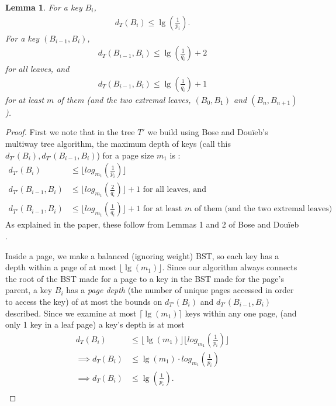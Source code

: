 \documentclass[letterpaper,12pt,titlepage,oneside,final]{book}
\theoremstyle{plain}
\newtheorem{lem}[thm]{Lemma}
\begin{document}
\begin{lem} \label{451}
For a key $B_i$,
\begin{align*} 
d_T(B_i) \leq \lg(\frac{1}{p_i}).
\end{align*}
For a key $(B_{i-1},B_i)$,
\begin{align*} 
d_T(B_{i-1},B_i) \leq \lg(\frac{1}{q_i}) + 2
\end{align*}
for all leaves, and
\begin{align*} 
d_T(B_{i-1},B_i) \leq \lg(\frac{1}{q_i}) + 1
\end{align*}
for at least $m$ of them (and the two extremal leaves, $(B_0, B_1)$ and $(B_n, B_{n+1})$). 
  
\end{lem}

\begin{proof}
First we note that in the tree $T'$ we build using Bose and Dou\"{i}eb's multiway tree algorithm, the maximum depth of keys (call this $d_{T'}(B_i), d_{T'}(B_{i-1},B_i)$) for a page size $m_1$ is \cite{bose2009efficient}:
\begin{align*} d_{T'}(B_i) &\leq \lfloor log_{m_1}(\frac{1}{p_i}) \rfloor \\
d_{T'}(B_{i-1},B_i) &\leq \lfloor log_{m_1}(\frac{2}{q_i}) \rfloor + 1 \text{ for all leaves, and}\\
d_{T'}(B_{i-1},B_i) &\leq \lfloor log_{m_1}(\frac{1}{q_i}) \rfloor + 1 \text{ for at least $m$ of them (and the two extremal leaves)}
 \end{align*}
As explained in the paper, these follow from Lemmas 1 and 2 of Bose and Dou\"{i}eb \cite{bose2009efficient}.

Inside a page, we make a balanced (ignoring weight) BST, so each key has a depth within a page of at most $\lfloor \lg(m_1) \rfloor$. Since our algorithm always connects the root of the BST made for a page to a key in the BST made for the page's parent, a key $B_i$ has a \textit{page depth} (the number of unique pages accessed in order to access the key) of at most the bounds on $d_{T'}(B_i)$ and $d_{T'}(B_{i-1},B_i)$ described. Since we examine at most $\lceil \lg(m_1) \rceil$ keys within any one page, (and only 1 key in a leaf page) a key's depth is at most
\begin{align*}
d_T(B_i) &\leq \lfloor \lg(m_1) \rfloor \lfloor log_{m_1}(\frac{1}{p_i}) \rfloor \\
\implies d_T(B_i) &\leq \lg(m_1)\cdot log_{m_1}(\frac{1}{p_i}) \\
\implies d_T(B_i) &\leq \lg(\frac{1}{p_i}). \\
\end{align*}


\end{proof}
\end{document}
